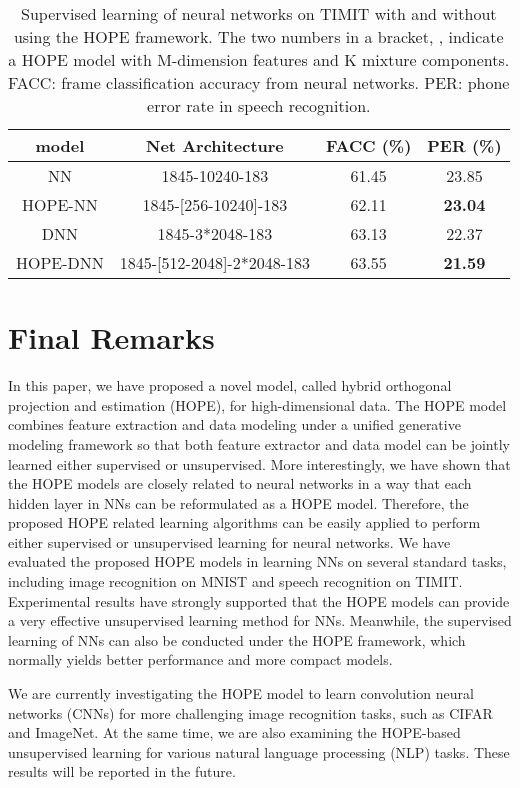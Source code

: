 \documentclass[11pt]{article}
\begin{document}
\begin{table}{}
\centering
\caption{ Supervised learning of neural networks on TIMIT with and without using the HOPE framework. The two numbers in a bracket, , indicate a HOPE model with M-dimension features and K mixture components. FACC: frame classification accuracy from neural networks. PER: phone error rate in speech recognition. }
\begin{tabular}{|c|c|c|c|}	\hline  
model & Net Architecture & FACC (\%) & PER (\%) \\  \hline \hline
NN  &  1845-10240-183 & 61.45  & 23.85 \\ \hline
HOPE-NN & 1845-[256-10240]-183 & 62.11 &  {\bf 23.04} \\ \hline \hline
DNN & 1845-3*2048-183& 63.13 &  22.37 \\ \hline 
HOPE-DNN & 1845-[512-2048]-2*2048-183& 63.55 & {\bf 21.59} \\ \hline 
\end{tabular} 
\label{exp-TIMIT-results}
\end{table}



\section{Final Remarks}

In this paper, we have proposed a novel model, called hybrid orthogonal projection and estimation (HOPE), for high-dimensional data. The HOPE model combines feature extraction and data modeling under a unified generative modeling framework so that both feature extractor and data model can be jointly learned either supervised or unsupervised. More interestingly, we have shown that the HOPE models are closely related to neural networks in a way that each hidden layer in NNs can be reformulated as a HOPE model. Therefore, the proposed HOPE related learning algorithms can be easily applied to perform either supervised or unsupervised learning for neural networks. We have evaluated the proposed HOPE models in learning NNs on several standard tasks, including image recognition on MNIST and speech recognition on TIMIT. Experimental results have strongly supported that the HOPE models can provide a very effective unsupervised learning method for NNs. Meanwhile, the supervised learning of NNs can also be conducted under the HOPE framework, which normally yields better performance and more compact models. 

We are currently investigating the HOPE model to learn convolution neural networks (CNNs) for more challenging image recognition tasks, such as CIFAR and ImageNet. At the same time, we are also examining the HOPE-based unsupervised learning for various natural language processing (NLP) tasks. These results will be reported in the future.
\end{document}
